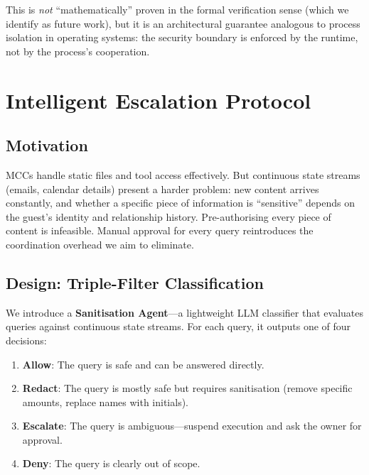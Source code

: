 This is \textit{not} ``mathematically'' proven in the formal verification sense (which we identify as future work), but it is an architectural guarantee analogous to process isolation in operating systems: the security boundary is enforced by the runtime, not by the process's cooperation.


\section{Intelligent Escalation Protocol}
\label{sec:escalation_protocol}

\subsection{Motivation}

MCCs handle static files and tool access effectively. But continuous state streams (emails, calendar details) present a harder problem: new content arrives constantly, and whether a specific piece of information is ``sensitive'' depends on the guest's identity and relationship history. Pre-authorising every piece of content is infeasible. Manual approval for every query reintroduces the coordination overhead we aim to eliminate.

\subsection{Design: Triple-Filter Classification}

We introduce a \textbf{Sanitisation Agent}---a lightweight LLM classifier that evaluates queries against continuous state streams. For each query, it outputs one of four decisions:

\begin{enumerate}
    \item \textbf{Allow}: The query is safe and can be answered directly.
    \item \textbf{Redact}: The query is mostly safe but requires sanitisation (remove specific amounts, replace names with initials).
    \item \textbf{Escalate}: The query is ambiguous---suspend execution and ask the owner for approval.
    \item \textbf{Deny}: The query is clearly out of scope.
\end{enumerate}

